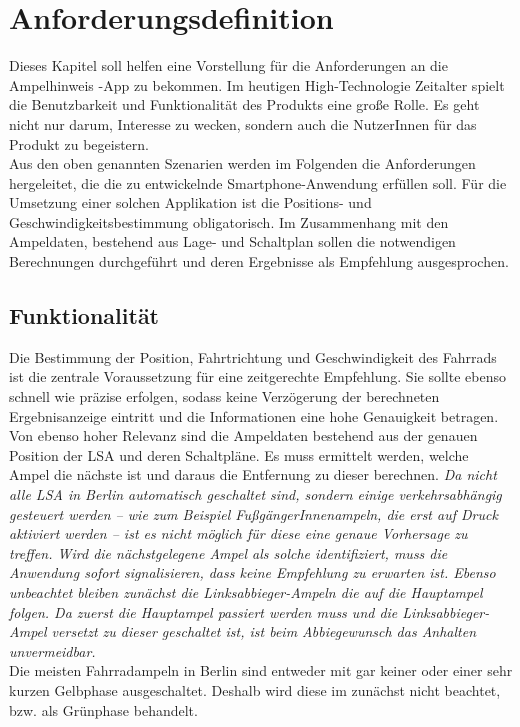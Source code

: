 \chapter{\label{chap:anforderungen}Anforderungsdefinition}
Dieses Kapitel soll helfen eine Vorstellung für die Anforderungen an die Ampelhinweis -App zu bekommen. Im heutigen High-Technologie Zeitalter spielt die Benutzbarkeit und Funktionalität des Produkts eine große Rolle. Es geht nicht nur darum, Interesse zu wecken, sondern auch die NutzerInnen für das Produkt zu begeistern. \\
Aus den oben genannten Szenarien werden im Folgenden die Anforderungen hergeleitet, die die zu entwickelnde \gls{Smartphone}-Anwendung erfüllen soll. Für die Umsetzung einer solchen Applikation ist die Positions- und Geschwindigkeitsbestimmung obligatorisch. Im Zusammenhang mit den Ampeldaten, bestehend aus Lage- und Schaltplan sollen die notwendigen Berechnungen durchgeführt und deren Ergebnisse als Empfehlung ausgesprochen.
\section{Funktionalität}
Die Bestimmung der Position, Fahrtrichtung und Geschwindigkeit des Fahrrads ist die zentrale Voraussetzung für eine zeitgerechte Empfehlung. Sie sollte ebenso schnell wie präzise erfolgen, sodass keine Verzögerung der berechneten Ergebnisanzeige eintritt und die Informationen eine hohe Genauigkeit betragen.\\
Von ebenso hoher Relevanz sind die Ampeldaten bestehend aus der genauen Position der \gls{LSA} und deren Schaltpläne. Es muss ermittelt werden, welche Ampel die nächste ist und daraus die Entfernung zu dieser berechnen. 
\textit{Da nicht alle \gls{LSA} in Berlin automatisch geschaltet sind, sondern einige verkehrsabhängig gesteuert werden -- wie zum Beispiel FußgängerInnenampeln, die erst auf Druck aktiviert werden -- ist es nicht möglich für diese eine genaue Vorhersage zu treffen. Wird die nächstgelegene Ampel als solche identifiziert, muss die Anwendung sofort signalisieren, dass keine Empfehlung zu erwarten ist. Ebenso unbeachtet bleiben zunächst die Linksabbieger-Ampeln die auf die Hauptampel folgen. Da zuerst die Hauptampel passiert werden muss und die Linksabbieger-Ampel versetzt zu dieser geschaltet ist, ist beim Abbiegewunsch das Anhalten unvermeidbar.}\\
Die meisten Fahrradampeln in Berlin sind entweder mit gar keiner oder einer sehr kurzen Gelbphase ausgeschaltet. Deshalb wird diese im zunächst nicht beachtet, bzw. als Grünphase behandelt.
